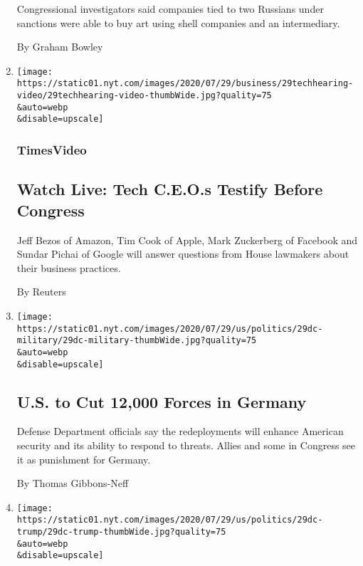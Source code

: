 \begin{enumerate}
  Congressional investigators said companies tied to two Russians under
  sanctions were able to buy art using shell companies and an
  intermediary.

  By Graham Bowley
\item
  \href{/video/us/politics/100000007262236/congress-tech-antitrust-hearings-live.html}{}

  \texttt{[image: https://static01.nyt.com/images/2020/07/29/business/29techhearing-video/29techhearing-video-thumbWide.jpg?quality=75\\\&auto=webp\\\&disable=upscale]}

  \hypertarget{timesvideo}{%
  \subsubsection{TimesVideo}\label{timesvideo}}

  \hypertarget{watch-live-tech-ceos-testify-before-congress}{%
  \subsection{Watch Live: Tech C.E.O.s Testify Before
  Congress}\label{watch-live-tech-ceos-testify-before-congress}}

  Jeff Bezos of Amazon, Tim Cook of Apple, Mark Zuckerberg of Facebook
  and Sundar Pichai of Google will answer questions from House lawmakers
  about their business practices.

  By Reuters
\item
  \href{/2020/07/29/world/europe/us-troops-nato-germany.html}{}

  \texttt{[image: https://static01.nyt.com/images/2020/07/29/us/politics/29dc-military/29dc-military-thumbWide.jpg?quality=75\\\&auto=webp\\\&disable=upscale]}

  \hypertarget{us-to-cut-12000-forces-in-germany}{%
  \subsection{U.S. to Cut 12,000 Forces in
  Germany}\label{us-to-cut-12000-forces-in-germany}}

  Defense Department officials say the redeployments will enhance
  American security and its ability to respond to threats. Allies and
  some in Congress see it as punishment for Germany.

  By Thomas Gibbons-Neff
\item
  \href{/2020/07/29/us/politics/trump-putin-bounties.html}{}

  \texttt{[image: https://static01.nyt.com/images/2020/07/29/us/politics/29dc-trump/29dc-trump-thumbWide.jpg?quality=75\\\&auto=webp\\\&disable=upscale]}


\end{enumerate}
